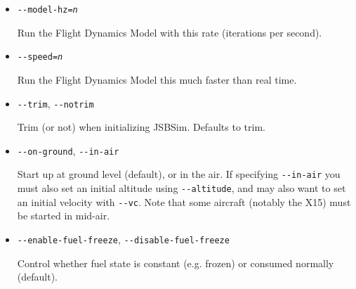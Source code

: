 \begin{itemize}
{\begin{itemize}
  \item{\texttt{-$ $-model-hz={\it n}}}

  Run the Flight Dynamics Model with this rate (iterations per second).

  \item{\texttt{-$ $-speed={\it n}}}

  Run the Flight Dynamics Model this much faster than real time.

  \item{\texttt{-$ $-trim}, \texttt{-$ $-notrim}}

  Trim (or not) when initializing JSBSim. Defaults to trim.

  \item{\texttt{-$ $-on-ground}, \texttt{-$ $-in-air}}

  Start up at ground level (default), or in the air. If specifying \texttt{-$ $-in-air} you
  must also set an initial altitude using \texttt{-$ $-altitude}, and may also want to set
  an initial velocity with \texttt{-$ $-vc}. Note that some aircraft (notably the X15) must
  be started in mid-air.

  \item{\texttt{-$ $-enable-fuel-freeze}, \texttt{-$ $-disable-fuel-freeze}}

  Control whether fuel state is constant (e.g. frozen) or consumed normally (default).

  \end{itemize}
}

\end{itemize}
